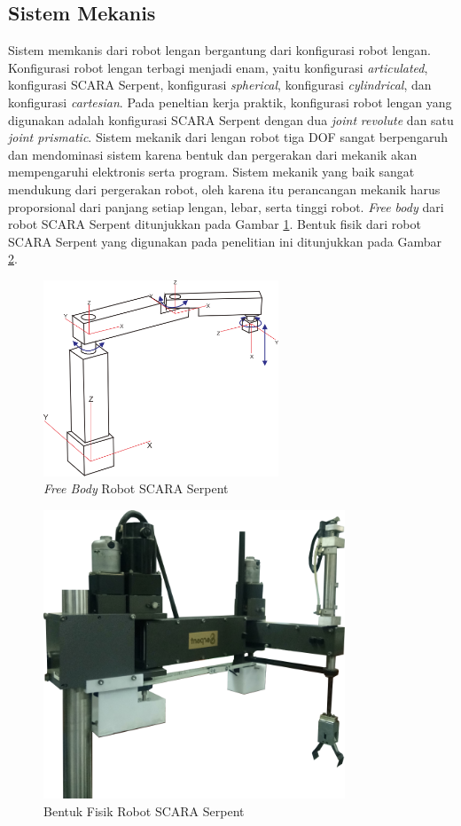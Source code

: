\subsection{ Sistem Mekanis }
Sistem memkanis dari robot lengan bergantung dari konfigurasi robot lengan. Konfigurasi robot lengan terbagi menjadi enam, yaitu konfigurasi \textit{articulated}, konfigurasi SCARA Serpent, konfigurasi \textit{spherical}, konfigurasi \textit{cylindrical}, dan konfigurasi \textit{cartesian}. Pada peneltian kerja praktik, konfigurasi robot lengan yang digunakan adalah konfigurasi SCARA Serpent dengan dua \textit{joint} \textit{revolute} dan satu \textit{joint prismatic}. Sistem mekanik dari lengan robot tiga DOF sangat berpengaruh dan mendominasi sistem karena bentuk dan pergerakan dari mekanik akan mempengaruhi elektronis serta program. Sistem mekanik yang baik sangat mendukung dari pergerakan robot, oleh karena itu perancangan mekanik harus proporsional dari panjang setiap lengan, lebar, serta tinggi robot. \textit{Free body} dari robot SCARA Serpent ditunjukkan pada Gambar \ref{pic.freebodySCARA}. Bentuk fisik dari robot SCARA Serpent yang digunakan pada penelitian ini ditunjukkan pada Gambar \ref{pic.fisikSCARA}. 
\begin{figure}[H]
	\centering
	\includegraphics[width=7cm]{gambar/SCARAA.png}
	\caption{\textit{Free Body} Robot SCARA Serpent}
	\label{pic.freebodySCARA}
\end{figure}
\begin{figure}[H]
	\centering
	\includegraphics[width=9cm]{gambar/3dSCARA.png}
	\caption{Bentuk Fisik Robot SCARA Serpent}
	\label{pic.fisikSCARA}
\end{figure}
